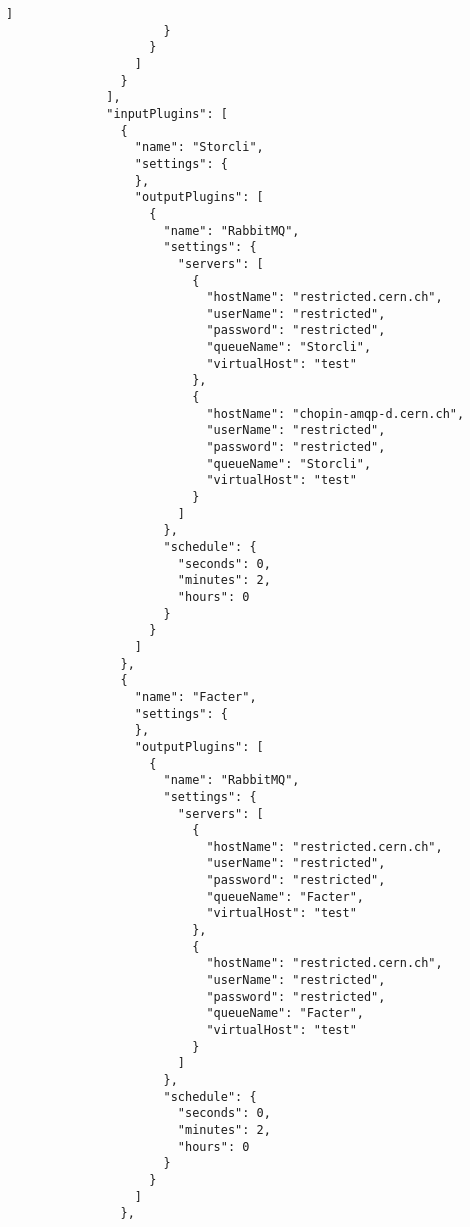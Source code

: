 \begin{lstlisting}[style=csharp, caption=Fichero de configuración]
                        ]
                      }
                    }
                  ]
                }
              ],
              "inputPlugins": [
                {
                  "name": "Storcli",
                  "settings": {
                  },
                  "outputPlugins": [
                    {
                      "name": "RabbitMQ",
                      "settings": {
                        "servers": [
                          {
                            "hostName": "restricted.cern.ch",
                            "userName": "restricted",
                            "password": "restricted",
                            "queueName": "Storcli",
                            "virtualHost": "test"
                          },
                          {
                            "hostName": "chopin-amqp-d.cern.ch",
                            "userName": "restricted",
                            "password": "restricted",
                            "queueName": "Storcli",
                            "virtualHost": "test"
                          }
                        ]
                      },
                      "schedule": {
                        "seconds": 0,
                        "minutes": 2,
                        "hours": 0
                      }
                    }
                  ]
                },
                {
                  "name": "Facter",
                  "settings": {
                  },
                  "outputPlugins": [
                    {
                      "name": "RabbitMQ",
                      "settings": {
                        "servers": [
                          {
                            "hostName": "restricted.cern.ch",
                            "userName": "restricted",
                            "password": "restricted",
                            "queueName": "Facter",
                            "virtualHost": "test"
                          },
                          {
                            "hostName": "restricted.cern.ch",
                            "userName": "restricted",
                            "password": "restricted",
                            "queueName": "Facter",
                            "virtualHost": "test"
                          }
                        ]
                      },
                      "schedule": {
                        "seconds": 0,
                        "minutes": 2,
                        "hours": 0
                      }
                    }
                  ]
                },

\end{lstlisting}
